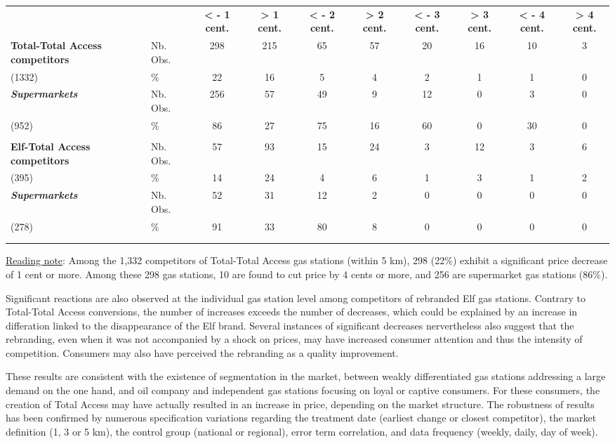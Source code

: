 \documentclass[english]{article}
\begin{document}
\begin{center}
\begin{tiny} %
\begin{tabular}{llcccccccc}
 &  &  &  &  &  &  &  &  & \tabularnewline
\hline
\hline
 &  & \textbf{< - 1 cent.}  & \textbf{> 1 cent.}  & \textbf{< - 2 cent.}  & \textbf{> 2 cent.}  & \textbf{< - 3 cent.}  & \textbf{> 3 cent.}  & \textbf{< - 4 cent.}  & \textbf{> 4 cent.}\tabularnewline
\hline
\textbf{Total-Total Access competitors}  & Nb. Obs.  & 298  & 215  & 65  & 57  & 20  & 16  & 10  & 3\tabularnewline
(1332)  & \%  & 22  & 16  & 5  & 4  & 2  & 1  & 1  & 0\tabularnewline
\textbf{\textit{Supermarkets}}  & Nb. Obs.  & 256  & 57  & 49  & 9  & 12  & 0  & 3  & 0\tabularnewline
(952)  & \%  & 86  & 27  & 75  & 16  & 60  & 0  & 30  & 0\tabularnewline
 &  &  &  &  &  &  &  &  & \tabularnewline
\hline
\textbf{Elf-Total Access competitors}  & Nb. Obs.  & 57  & 93  & 15  & 24  & 3  & 12  & 3  & 6\tabularnewline
(395)  & \%  & 14  & 24  & 4  & 6  & 1  & 3  & 1  & 2\tabularnewline
\textbf{\textit{Supermarkets}}  & Nb. Obs.  & 52  & 31  & 12  & 2  & 0  & 0  & 0  & 0\tabularnewline
(278)  & \%  & 91  & 33  & 80  & 8  & 0  & 0  & 0  & 0\tabularnewline
 &  &  &  &  &  &  &  &  & \tabularnewline
\hline
\hline
 &  &  &  &  &  &  &  &  & \tabularnewline
\end{tabular}\end{tiny}
\par\end{center}

{\small{}\uline{Reading note}}{\small{}:} Among the 1,332 competitors of Total-Total Access gas stations (within 5 km), 298 (22\%) exhibit a significant price decrease of 1 cent or more. Among these 298 gas stations, 10 are found to cut price by 4 cents or more, and 256 are supermarket gas stations (86\%).
\medskip{}

Significant reactions are also observed at the individual gas station level among competitors of rebranded Elf gas stations. Contrary to Total-Total Access conversions, the number of increases exceeds the number of decreases, which could be explained by an increase in differation linked to the disappearance of the Elf brand. Several instances of significant decreases nervertheless also suggest that the rebranding, even when it was not accompanied by a shock on prices, may have increased consumer attention and thus the intensity of competition. Consumers may also have perceived the rebranding as a quality improvement.
\medskip{}

These results are consistent with the existence of segmentation in the market, between weakly differentiated gas stations addressing a large demand on the one hand, and oil company and independent gas stations focusing on loyal or captive consumers. For these consumers, the creation of Total Access may have actually resulted in an increase in price, depending on the market structure. The robustness of results has been confirmed by numerous specification variations regarding the treatment date (earliest change or closest competitor), the market definition (1, 3 or 5 km), the control group (national or regional), error term correlation, and data frequency (weekly, daily, day of week).
\end{document}
